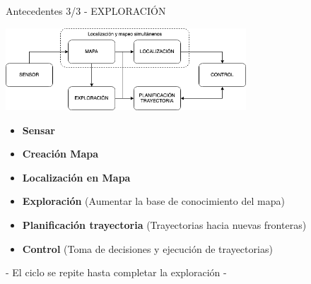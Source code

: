 \documentclass[
  24pt, %
  aspectratio=169, %
]{beamer}
\begin{document}
\begin{frame}{Antecedentes 3/3 - EXPLORACIÓN}
  
  \centering
  \includegraphics[width=9cm]{exploracion}\\
  
  \begin{itemize}
  \item \textbf{Sensar}
  \item \textbf{Creación Mapa} 
  \item \textbf{Localización en Mapa}
  \item \textbf{Exploración} (Aumentar la base de conocimiento del mapa)
  \item \textbf{Planificación trayectoria} (Trayectorias hacia nuevas fronteras) 
  \item \textbf{Control} (Toma de decisiones y ejecución de trayectorias)
  \end{itemize}

  \alert{- El ciclo se repite hasta completar la exploración -}
  
\end{frame}
\end{document}
